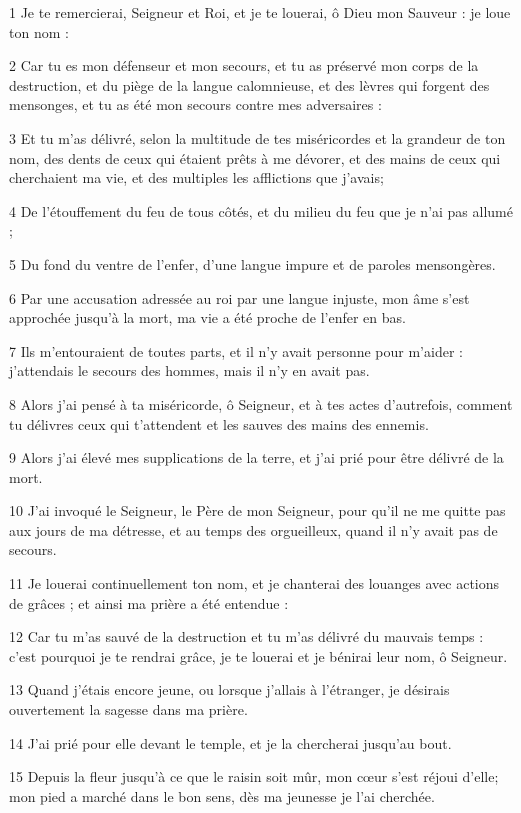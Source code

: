 \par 1 Je te remercierai, Seigneur et Roi, et je te louerai, ô Dieu mon Sauveur : je loue ton nom :
\par 2 Car tu es mon défenseur et mon secours, et tu as préservé mon corps de la destruction, et du piège de la langue calomnieuse, et des lèvres qui forgent des mensonges, et tu as été mon secours contre mes adversaires :
\par 3 Et tu m'as délivré, selon la multitude de tes miséricordes et la grandeur de ton nom, des dents de ceux qui étaient prêts à me dévorer, et des mains de ceux qui cherchaient ma vie, et des multiples les afflictions que j'avais;
\par 4 De l'étouffement du feu de tous côtés, et du milieu du feu que je n'ai pas allumé ;
\par 5 Du fond du ventre de l'enfer, d'une langue impure et de paroles mensongères.
\par 6 Par une accusation adressée au roi par une langue injuste, mon âme s'est approchée jusqu'à la mort, ma vie a été proche de l'enfer en bas.
\par 7 Ils m'entouraient de toutes parts, et il n'y avait personne pour m'aider : j'attendais le secours des hommes, mais il n'y en avait pas.
\par 8 Alors j'ai pensé à ta miséricorde, ô Seigneur, et à tes actes d'autrefois, comment tu délivres ceux qui t'attendent et les sauves des mains des ennemis.
\par 9 Alors j'ai élevé mes supplications de la terre, et j'ai prié pour être délivré de la mort.
\par 10 J'ai invoqué le Seigneur, le Père de mon Seigneur, pour qu'il ne me quitte pas aux jours de ma détresse, et au temps des orgueilleux, quand il n'y avait pas de secours.
\par 11 Je louerai continuellement ton nom, et je chanterai des louanges avec actions de grâces ; et ainsi ma prière a été entendue :
\par 12 Car tu m'as sauvé de la destruction et tu m'as délivré du mauvais temps : c'est pourquoi je te rendrai grâce, je te louerai et je bénirai leur nom, ô Seigneur.
\par 13 Quand j'étais encore jeune, ou lorsque j'allais à l'étranger, je désirais ouvertement la sagesse dans ma prière.
\par 14 J'ai prié pour elle devant le temple, et je la chercherai jusqu'au bout.
\par 15 Depuis la fleur jusqu'à ce que le raisin soit mûr, mon cœur s'est réjoui d'elle; mon pied a marché dans le bon sens, dès ma jeunesse je l'ai cherchée.

